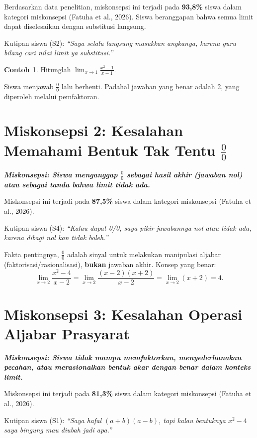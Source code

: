 \documentclass[12pt,a4paper,openany]{book}
\theoremstyle{definition}
\newtheorem{example}{Contoh}
\newcommand{\miskonsepsi}[1]{\textbf{\textit{Miskonsepsi: #1}}}
\begin{document}
Berdasarkan data penelitian, miskonsepsi ini terjadi pada \textbf{93,8\%} siswa dalam kategori miskonsepsi (Fatuha et al., 2026). Siswa beranggapan bahwa semua limit dapat diselesaikan dengan substitusi langsung. 

Kutipan siswa (S2): \textit{``Saya selalu langsung masukkan angkanya, karena guru bilang cari nilai limit ya substitusi.''}

\begin{example}
Hitunglah $\displaystyle \lim_{x \to 1} \frac{x^2 - 1}{x - 1}$.

Siswa menjawab $\frac{0}{0}$ lalu berhenti. Padahal jawaban yang benar adalah 2, yang diperoleh melalui pemfaktoran.
\end{example}

\section{Miskonsepsi 2: Kesalahan Memahami Bentuk Tak Tentu $\frac{0}{0}$}

\miskonsepsi{Siswa menganggap $\frac{0}{0}$ sebagai hasil akhir (jawaban nol) atau sebagai tanda bahwa limit tidak ada.}

Miskonsepsi ini terjadi pada \textbf{87,5\%} siswa dalam kategori miskonsepsi (Fatuha et al., 2026). 

Kutipan siswa (S4): \textit{``Kalau dapat 0/0, saya pikir jawabannya nol atau tidak ada, karena dibagi nol kan tidak boleh.''}

Fakta pentingnya, $\frac{0}{0}$ adalah sinyal untuk melakukan manipulasi aljabar (faktorisasi/rasionalisasi), \textbf{bukan} jawaban akhir. Konsep yang benar:
\[
\lim_{x \to 2} \frac{x^2 - 4}{x - 2} = \lim_{x \to 2} \frac{(x - 2)(x + 2)}{x - 2} = \lim_{x \to 2} (x + 2) = 4.
\]

\section{Miskonsepsi 3: Kesalahan Operasi Aljabar Prasyarat}

\miskonsepsi{Siswa tidak mampu memfaktorkan, menyederhanakan pecahan, atau merasionalkan bentuk akar dengan benar dalam konteks limit.}

Miskonsepsi ini terjadi pada \textbf{81,3\%} siswa dalam kategori miskonsepsi (Fatuha et al., 2026).

Kutipan siswa (S1): \textit{``Saya hafal $(a + b)(a - b)$, tapi kalau bentuknya $x^2 - 4$ saya bingung mau diubah jadi apa.''}
\end{document}

